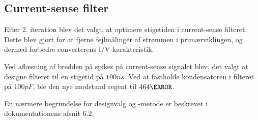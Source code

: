 
\subsection{Current-sense filter}
Efter 2. iteration blev det valgt, at optimere stigetiden i current-sense filteret. Dette blev gjort for at fjerne fejlmålinger af strømmen i primærviklingen, og dermed forbedre converterens I/V-karakteristik. 

Ved aflæsning af bredden på spikes på current-sense signalet blev, det valgt at designe filteret til en stigetid på $100ns$. Ved at fastholde kondensatoren i filteret på $100pF$, ble den nye modstand regent til $464\ohm$. 

En nærmere begrundelse for designvalg og -metode er beskrevet i dokumentationens afsnit 6.2.